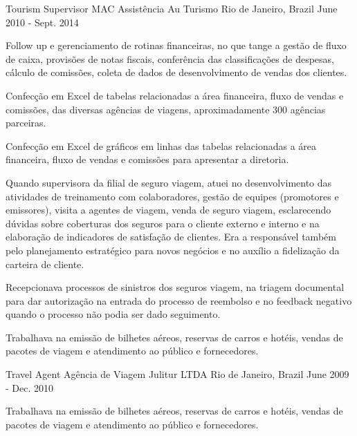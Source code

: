 \begin{cventries}
\cventry
{Tourism Supervisor} %
{MAC Assistência Au Turismo} %
{Rio de Janeiro, Brazil} %
{June 2010 - Sept. 2014} %
{ %
\begin{cvitems}
\item {Follow up e gerenciamento de rotinas financeiras, no que tange a gestão de fluxo de caixa, provisões de notas
fiscais, conferência das classificações de despesas, cálculo de comissões, coleta de dados de desenvolvimento
de vendas dos clientes.}
\item {Confecção em Excel de tabelas relacionadas a área financeira, fluxo de vendas e comissões, das diversas
agências de viagens, aproximadamente 300 agências parceiras.}
\item {Confecção em Excel de gráficos em linhas das tabelas relacionadas a área financeira, fluxo de vendas e comissões para apresentar a diretoria.}
\item {Quando supervisora da filial de seguro viagem, atuei no desenvolvimento das atividades de treinamento com
colaboradores, gestão de equipes (promotores e emissores), visita a agentes de viagem, venda de seguro
viagem, esclarecendo dúvidas sobre coberturas dos seguros para o cliente externo e interno e na elaboração
de indicadores de satisfação de clientes. Era a responsável também pelo planejamento estratégico para novos
negócios e no auxílio a fidelização da carteira de cliente.}
\item {Recepcionava processos de sinistros dos seguros viagem, na triagem documental para dar autorização na
entrada do processo de reembolso e no feedback negativo quando o processo não podia ser dado seguimento.}
\item {Trabalhava na emissão de bilhetes aéreos, reservas de carros e hotéis, vendas de pacotes de viagem e
atendimento ao público e fornecedores.}
\end{cvitems}
}

\cventry
{Travel Agent} %
{Agência de Viagem Julitur LTDA} %
{Rio de Janeiro, Brazil} %
{June 2009 - Dec. 2010} %
{ %
\begin{cvitems}
\item {Trabalhava na emissão de bilhetes aéreos, reservas de carros e hotéis, vendas de pacotes de viagem e
atendimento ao público e fornecedores.}
\end{cvitems}
}


\end{cventries}